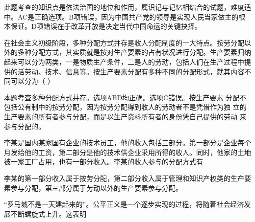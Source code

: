 \par{}
\begin{solution}此题考查的知识点是依法治国的地位和作用，属识记与记忆相结合的试题，难度适中。AC是正确选项。B项错误，因为中国共产党的领导是实现人民当家做主的根本保证。D项错误在于改革开放是决定当代中国命运的关键抉择。
\end{solution}
\question 在社会主义初级阶段，多种分配方式并存是收人分配制度的一大特点。按劳分配以
外的多种分配方式，其实质就是按对生产要素的占有状况进行分配。生产要素归纳
起来可以分为两类，一是物质生产条件，二是人的劳动，包括人们在生产过程中提
供的活劳动、技术、信息等。按生产要素分配有多种不同的分配形式，就其内容不
同可以分为（ ）
\par{}
\begin{solution}本题考查多种分配方式并存。选项ABD均正确。选项C错误。按生产要素
分配不包括公有制中的按劳分配，因为按劳分配得到收人的劳动者不是凭借作为独
立的生产要素的所有者参与分配，而是以生产资料所有者的身份凭自己提供的劳动
来参与分配的。
\end{solution}
\question 李某是国内某家国有企业的技术员工，他的收入包括三部分。第一部分是企业每个月发给他的工资，第二部分是他的技术供企业采用所得的收人。同时，他家的土地被一家工厂占用，也有一部分收入。李某的收人参与的分配方式有
\par{}
\begin{solution}李某的第一部分收入属于按劳分配，第二部分收入属于管理和知识产权类的生产要素参与分配，第三部分属于劳动以外的生产要素参与分配。
\end{solution}
\question ``罗马城不是一天建起来的''。公平正义是一个逐步实现的过程，将随着社会经济发展不断螺旋式上升。这表明
\par{}
